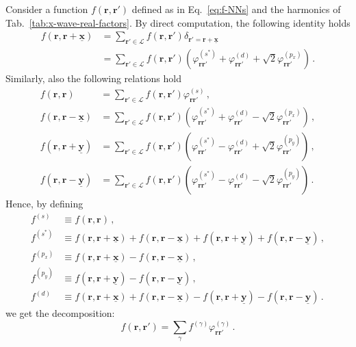 \begin{tabproof}
	
	Consider a function $f(\mathbf{r},\mathbf{r}')$ defined as in Eq.~\eqref{eq:f-NNs} and the harmonics of Tab.~\ref{tab:x-wave-real-factors}. By direct computation, the following identity holds
	\[
	\begin{aligned}
		f(\mathbf{r},\mathbf{r}+\underline{\mathbf{x}}) &= \sum_{\mathbf{r}'\in\mathcal{L}} f(\mathbf{r},\mathbf{r}') \delta_{\mathbf{r}'=\mathbf{r}+\underline{\mathbf{x}}} \\
		&= \sum_{\mathbf{r}'\in\mathcal{L}} f(\mathbf{r},\mathbf{r}') \left(
			\varphi^{(s^*)}_{\mathbf{r}\mathbf{r}'} + \varphi^{(d)}_{\mathbf{r}\mathbf{r}'} + \sqrt{2} \varphi^{(p_x)}_{\mathbf{r}\mathbf{r}'}
		\right) \, .
	\end{aligned}
	\]
	Similarly, also the following relations hold
	\[
	\begin{aligned}
		f(\mathbf{r},\mathbf{r}) &= \sum_{\mathbf{r}'\in\mathcal{L}} f(\mathbf{r},\mathbf{r}') \varphi^{(s)}_{\mathbf{r}\mathbf{r}'} \, , \\
		f(\mathbf{r},\mathbf{r}-\underline{\mathbf{x}})
		&= \sum_{\mathbf{r}'\in\mathcal{L}} f(\mathbf{r},\mathbf{r}') \left(
		\varphi^{(s^*)}_{\mathbf{r}\mathbf{r}'} + \varphi^{(d)}_{\mathbf{r}\mathbf{r}'} - \sqrt{2} \varphi^{(p_x)}_{\mathbf{r}\mathbf{r}'}
		\right) \, , \\		f(\mathbf{r},\mathbf{r}+\underline{\mathbf{y}})
		&= \sum_{\mathbf{r}'\in\mathcal{L}} f(\mathbf{r},\mathbf{r}') \left(
		\varphi^{(s^*)}_{\mathbf{r}\mathbf{r}'} - \varphi^{(d)}_{\mathbf{r}\mathbf{r}'} + \sqrt{2} \varphi^{(p_y)}_{\mathbf{r}\mathbf{r}'}
		\right) \, , \\
		f(\mathbf{r},\mathbf{r}-\underline{\mathbf{y}})
		&= \sum_{\mathbf{r}'\in\mathcal{L}} f(\mathbf{r},\mathbf{r}') \left(
		\varphi^{(s^*)}_{\mathbf{r}\mathbf{r}'} - \varphi^{(d)}_{\mathbf{r}\mathbf{r}'} - \sqrt{2} \varphi^{(p_y)}_{\mathbf{r}\mathbf{r}'}
		\right) \, .
	\end{aligned}
	\]
	Hence, by defining
	\[
	\begin{aligned}
		f^{(s)} &\equiv f(\mathbf{r},\mathbf{r}) \, , \\
		f^{(s^*)} &\equiv f(\mathbf{r},\mathbf{r}+\underline{\mathbf{x}}) + f(\mathbf{r},\mathbf{r}-\underline{\mathbf{x}}) + f(\mathbf{r},\mathbf{r}+\underline{\mathbf{y}}) + f(\mathbf{r},\mathbf{r}-\underline{\mathbf{y}}) \, , \\
		f^{(p_x)} &\equiv f(\mathbf{r},\mathbf{r}+\underline{\mathbf{x}}) - f(\mathbf{r},\mathbf{r}-\underline{\mathbf{x}}) \, , \\
		f^{(p_y)} &\equiv f(\mathbf{r},\mathbf{r}+\underline{\mathbf{y}}) - f(\mathbf{r},\mathbf{r}-\underline{\mathbf{y}}) \, , \\
		f^{(d)} &\equiv f(\mathbf{r},\mathbf{r}+\underline{\mathbf{x}}) + f(\mathbf{r},\mathbf{r}-\underline{\mathbf{x}}) - f(\mathbf{r},\mathbf{r}+\underline{\mathbf{y}}) - f(\mathbf{r},\mathbf{r}-\underline{\mathbf{y}}) \, .
	\end{aligned}
	\]
	we get the decomposition:
	\[
		f(\mathbf{r},\mathbf{r}') = 	\sum_\gamma f^{(\gamma)} \varphi_{\mathbf{r}\mathbf{r}'}^{(\gamma)} \, .
	\]
	

\end{tabproof}
